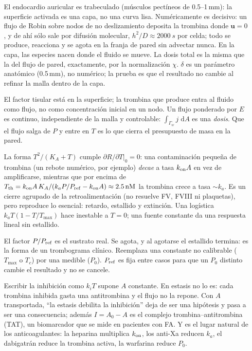 \documentclass[11pt,a4paper]{article}
\newcommand{\dd}{\,\mathrm{d}}
\newcommand{\bu}{\bm{u}}
\newcommand{\Pref}{P_{\rm ref}}
\begin{document}
\begin{description}[leftmargin=1.1em,style=nextline]
\item[Capa endocárdica en vez de línea de pared.] El endocardio auricular es trabeculado (músculos pectíneos de 0.5--1\,mm): la superficie activada es una capa, no una curva lisa. Numéricamente es decisivo: un flujo de Robin sobre nodos de no deslizamiento deposita la trombina donde $\bu=0$, y de ahí sólo sale por difusión molecular, $h^2/D\approx\SI{2000}{s}$ por celda; todo se produce, reacciona y se agota en la franja de pared sin advectar nunca. En la capa, las especies nacen donde el fluido se mueve. La dosis total es la misma que la del flujo de pared, exactamente, por la normalización $\chi$. $\delta$ es un parámetro anatómico (0.5\,mm), no numérico; la prueba es que el resultado no cambie al refinar la malla dentro de la capa.
\item[Flujo de pared en vez de semilla puntual.] El factor tisular está en la superficie; la trombina que produce entra al fluido como flujo, no como concentración inicial en un nodo. Un flujo ponderado por $E$ es continuo, independiente de la malla y controlable: $\int_{\Gamma_w}j\,\dd A$ es una \emph{dosis}. Que el flujo salga de $P$ y entre en $T$ es lo que cierra el presupuesto de masa en la pared.
\item[Amplificación con umbral, no logística ni constante.] La forma $T^2/(K_A+T)$ cumple $\partial R/\partial T|_{0}=0$: una contaminación pequeña de trombina (un rebote numérico, por ejemplo) \emph{decae} a tasa $k_{\rm on}A$ en vez de amplificarse, mientras que por encima de $T_{\rm th}=k_{\rm on}A\,K_A/(k_aP/\Pref-k_{\rm on}A)\approx\SI{2.5}{nM}$ la trombina crece a tasa $\sim k_a$. Es un cierre agrupado de la retroalimentación (no resuelve FV, FVIII ni plaquetas), pero reproduce lo esencial: retardo, estallido y extinción. Una logística $k_aT(1-T/T_{\max})$ hace inestable a $T=0$; una fuente constante da una respuesta lineal sin estallido.
\item[Protrombina como variable, no un tope.] El factor $P/\Pref$ es el sustrato real. Se agota, y al agotarse el estallido termina: es la forma de un trombograma clínico. Reemplaza una constante no calibrable ($T_{\max}$ o $T_c$) por una medible ($P_0$). $\Pref$ es fija entre casos para que un $P_0$ distinto cambie el resultado y no se cancele.
\item[Antitrombina explícita.] Escribir la inhibición como $k_iT$ supone $A$ constante. En estasis no lo es: cada trombina inhibida gasta una antitrombina y el flujo no la repone. Con $A$ transportada, ``la estasis debilita la inhibición'' deja de ser una hipótesis y pasa a ser una consecuencia; además $I=A_0-A$ es el complejo trombina--antitrombina (TAT), un biomarcador que se mide en pacientes con FA. Y es el lugar natural de los anticoagulantes: la heparina multiplica $k_{\rm on}$, los anti-Xa reducen $k_a$, el dabigatrán reduce la trombina activa, la warfarina reduce $P_0$.

\end{description}
\end{document}
